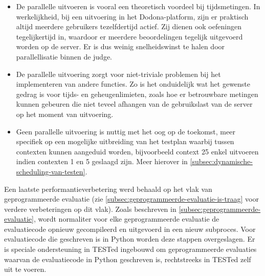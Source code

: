 \begin{itemize}
    \item De parallelle uitvoeren is vooral een theoretisch voordeel bij tijdsmetingen.
    In werkelijkheid, bij een uitvoering in het Dodona-platform, zijn er praktisch altijd meerdere gebruikers tezelfdertijd actief.
    Zij dienen ook oefeningen tegelijkertijd in, waardoor er meerdere beoordelingen tegelijk uitgevoerd worden op de server.
    Er is dus weinig snelheidswinst te halen door parallellisatie binnen de judge.
    \item De parallelle uitvoering zorgt voor niet-triviale problemen bij het implementeren van andere functies.
    Zo is het onduidelijk wat het gewenste gedrag is voor tijds- en geheugenlimieten, zoals hoe er betrouwbare metingen kunnen gebeuren die niet teveel afhangen van de gebruikslast van de server op het moment van uitvoering.
    \item Geen parallelle uitvoering is nuttig met het oog op de toekomst, meer specifiek op een mogelijke uitbreiding van het testplan waarbij  tussen contexten kunnen aangeduid worden, bijvoorbeeld context 25 enkel uitvoeren indien contexten 1 en 5 geslaagd zijn.
    Meer hierover in \cref{subsec:dynamische-scheduling-van-testen}.
\end{itemize}

Een laatste performantieverbetering werd behaald op het vlak van geprogrammeerde evaluatie (zie \cref{subsec:geprogrammeerde-evaluatie-is-traag} voor verdere verbeteringen op dit vlak).
Zoals beschreven in \cref{subsec:geprogrammeerde-evaluatie}, wordt normaliter voor elke geprogrammeerde evaluatie de evaluatiecode opnieuw gecompileerd en uitgevoerd in een nieuw subproces.
Voor evaluatiecode die geschreven is in Python worden deze stappen overgeslagen.
Er is speciale ondersteuning in TESTed ingebouwd om geprogrammeerde evaluaties waarvan de evaluatiecode in Python geschreven is, rechtstreeks in TESTed zelf uit te voeren.

